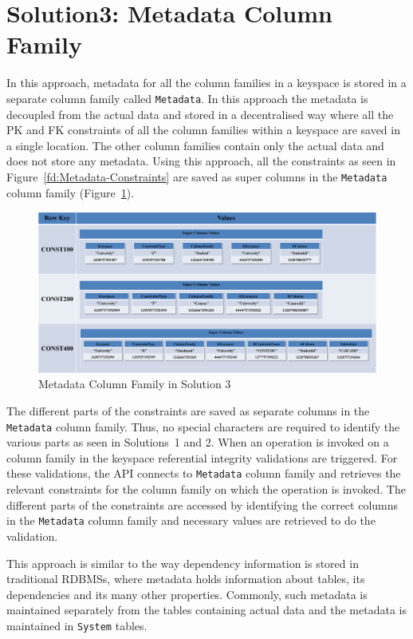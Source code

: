 \section{Solution3:  Metadata Column Family} \label{s:design-sol3}

In this approach,     metadata for all the column families in a keyspace is
stored in a separate column family called \texttt{Metadata}.   In this approach the metadata is
decoupled from the actual data and stored in a decentralised way where all the
\ac{PK} and \ac{FK} constraints of all the column families within a keyspace are
saved in a single location.  The other column families contain only the actual
data and does not store any metadata.  Using this approach,  all the constraints
as seen in Figure~\ref{fd:Metadata-Constraints} are saved as super columns in
the \texttt{Metadata} column family (Figure~\ref{fd:Metadata-Solution3}). 
 
	\begin{figure}[h] 
		\centering
		\includegraphics[width=.8\textwidth]{./figure/Solutions/Sol3-MD-ColumnFamily.png}
		\caption{Metadata Column Family in Solution 3}\label{fd:Metadata-Solution3}
	\end{figure}

The different parts of the constraints are saved as separate columns in the
\texttt{Metadata} column family. Thus,  no special characters are required to
identify the various parts as seen in Solutions~1 and 2.  When an operation is
invoked on a column family in the keyspace referential integrity validations
are triggered.  For these validations,  the \ac{API} connects to \texttt{Metadata}
column family and retrieves the relevant constraints for the column family on
which the operation is invoked. 
The different parts of the constraints are accessed by identifying the
correct columns in the \texttt{Metadata} column family and necessary values are
retrieved to do the validation. 

This approach is similar to the way dependency information is
stored in traditional \acp{RDBMS},  where metadata holds information
about tables,  its dependencies and its many other properties.  Commonly,  such
metadata is maintained separately from the tables containing actual data and the
metadata is maintained in \texttt{System} tables.  

